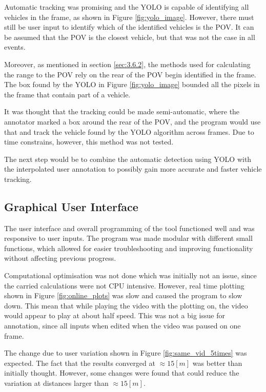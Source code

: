 Automatic tracking was promising and the YOLO is capable of identifying all vehicles in the frame, as shown in Figure \ref{fig:yolo_image}. However, there must still be user input to identify which of the identified vehicles is the POV. It can be assumed that the POV is the closest vehicle, but that was not the case in all events. 

Moreover, as mentioned in section \ref{sec:3.6.2}, the methods used for calculating the range to the POV rely on the rear of the POV begin identified in the frame. The box found by the YOLO in Figure \ref{fig:yolo_image} bounded all the pixels in the frame that contain part of a vehicle.

It was thought that the tracking could be made semi-automatic, where the annotator marked a box around the rear of the POV, and the program would use that and track the vehicle found by the YOLO algorithm across frames. Due to time constrains, however, this method was not tested. 

The next step would be to combine the automatic detection using YOLO with the interpolated user annotation to possibly gain more accurate and faster vehicle tracking.

\subsection{Graphical User Interface}

The user interface and overall programming of the tool functioned well and was responsive to user inputs. The program was made modular with different small functions, which allowed for easier troubleshooting and improving functionality without affecting previous progress.

Computational optimisation was not done which was initially not an issue, since the carried calculations were not CPU intensive. However, real time plotting shown in Figure \ref{fig:online_plots} was slow and caused the program to slow down. This mean that while playing the video with the plotting on, the video would appear to play at about half speed. This was not a big issue for annotation, since all inputs when edited when the video was paused on one frame.  

The change due to user variation shown in Figure \ref{fig:same_vid_5times} was expected. The fact that the results converged at $\approx 15[m]$ was better than initially thought. However, some changes were found that could reduce the variation at distances larger than $\approx 15[m]$. 

